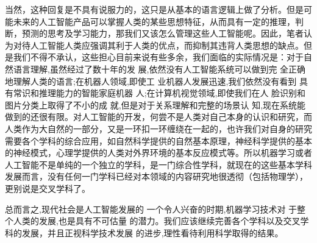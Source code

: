 \documentclass{article}
\begin{document}
当然，这种回复是不具有说服力的，这只是从基本的语言逻辑上做了分析。但是可能未来的人工智能产品可以掌握人类的某些思想特征，从而具有一定的推理，判断，预测的思考及学习能力，那我们又该怎么管理这些人工智能呢。因此，笔者认为对待人工智能人类应强调其利于人类的优点，而抑制其违背人类思想的缺点。但是我们不得不承认，这些担心目前来说有些多余，我们面临的实际情况是：对于自然语言理解,虽然经过了数十年的发 展,依然没有人工智能系统可以做到完 全正确地理解人类的语言;在机器人领域,即使工 业机器人发展迅速,我们依然没有看到 具有常识和推理能力的智能家庭机器 人;在计算机视觉领域,即使我们在人 脸识别和图片分类上取得了不小的成 就,但是对于关系理解和完整的场景认 知,现在系统能做到的还很有限。对人工智能的开发，何尝不是人类对自己本身的认识和研究，而人类作为大自然的一部分，又是一环扣一环缠绕在一起的，也许我们对自身的研究需要各个学科的综合应用，如自然科学提供的自然基本原理，神经科学提供的基本的神经模式，心理学提供的人类对外界环境的基本反应模式等。所以机器学习或者人工智能不是单纯的一个独立的学科，是一门综合性学科，就现在的这些基本学科发展而言，没有任何一门学科已经对本领域的内容研究地很透彻（包括物理学），更别说是交叉学科了。

总而言之,现代社会是人工智能发展的 一个令人兴奋的时期,机器学习技术对 于整个人类的发展,也是具有不可估量 的潜力。我们应该继续完善各个学科以及交叉学科的发展，并且正视科学技术发展 的进步,理性看待利用科学取得的结果。
\end{document}
